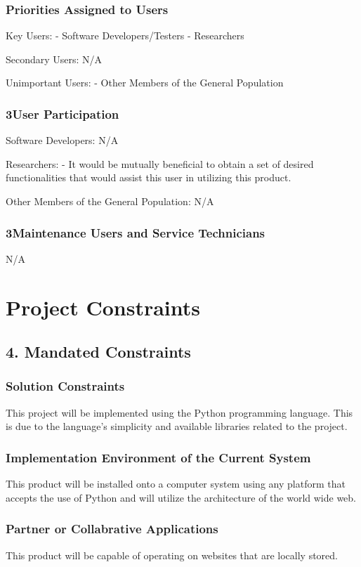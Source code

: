 \documentclass[titlepage]{article}
\begin{document}
\subsubsection*{Priorities Assigned to Users}
Key Users:
- Software Developers/Testers
- Researchers

Secondary Users:
N/A

Unimportant Users:
- Other Members of the General Population

\subsubsection*{3User Participation}
Software Developers:
N/A

Researchers:
- It would be mutually beneficial to obtain a set of desired functionalities that would assist this user in utilizing this product.

Other Members of the General Population:
N/A

\subsubsection*{3Maintenance Users and Service Technicians}
N/A


\section{Project Constraints}

\subsection{4. Mandated Constraints}

\subsubsection*{Solution Constraints}
	This project will be implemented using the Python programming language. This is due to the language’s simplicity and available libraries related to the project.

\subsubsection*{Implementation Environment of the Current System}
This product will be installed onto a computer system using any platform that accepts the use of Python and will utilize the architecture of the world wide web.

\subsubsection*{Partner or Collabrative Applications}
This product will be capable of operating on websites that are locally stored.
\end{document}
